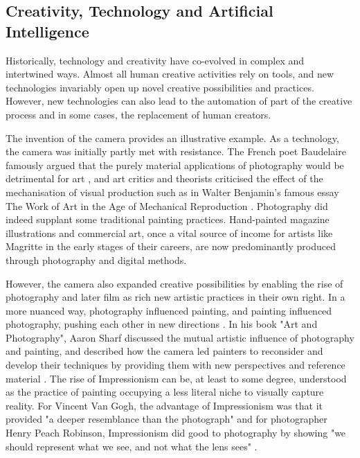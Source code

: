 \subsection{Creativity, Technology and Artificial Intelligence}

Historically, technology and creativity have co-evolved in complex and intertwined ways. Almost all human creative activities rely on tools, and new technologies invariably open up novel creative possibilities and practices. However, new technologies can also lead to the automation of part of the creative process and in some cases, the replacement of human creators.

The invention of the camera provides an illustrative example. As a technology, the camera was initially partly met with resistance. The French poet Baudelaire famously argued that the purely material applications of photography would be detrimental for art \cite{Baudelaire1955-ae}, and art critics and theorists criticised the effect of the mechanisation of visual production such as in Walter Benjamin's famous essay The Work of Art in the Age of Mechanical Reproduction \cite{Benjamin1935-wd} . Photography did indeed supplant some traditional painting practices. Hand-painted magazine illustrations and commercial art, once a vital source of income for artists like Magritte in the early stages of their careers, are now predominantly produced through photography and digital methods. 

However, the camera also expanded creative possibilities by enabling the rise of photography and later film as rich new artistic practices in their own right. In a more nuanced way, photography influenced painting, and painting influenced photography, pushing each other in new directions . In his book "Art and Photography", Aaron Sharf discussed the mutual artistic influence of photography and painting, and described how the camera led painters to reconsider and develop their techniques by providing them with new perspectives and reference material \cite{Scharf1968-na}. The rise of Impressionism can be, at least to some degree, understood as the practice of painting occupying a less literal niche to visually capture reality. For Vincent Van Gogh, the advantage of Impressionism was that it provided "a deeper resemblance than the photograph" \cite[p. 116]{Marmor1997-ka} and for photographer Henry Peach Robinson, Impressionism did good to photography by showing "we should represent what we see, and not what the lens sees" \cite[p. 87]{Robinson1896-mo}. 

